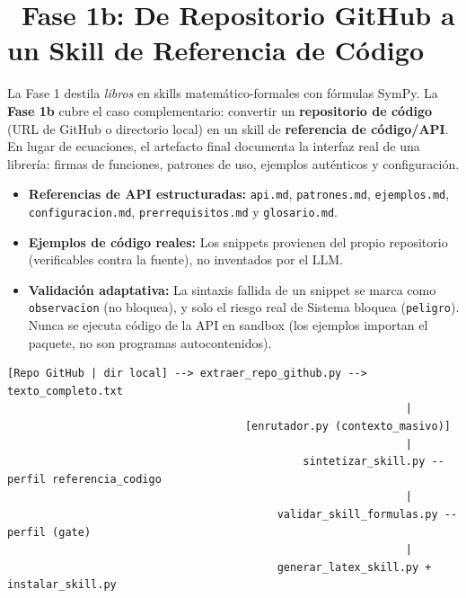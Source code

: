 \documentclass[11pt,a4paper]{article}
\newcommand{\iconotexto}[2]{\textcolor{cyanNeon}{\faIcon{#1}}~#2}
\begin{document}
\newpage
\section[Fase 1b: Repositorio a Skill de API]{\iconotexto{code-branch}{Fase 1b: De Repositorio GitHub a un Skill de Referencia de Código}}

La Fase 1 destila \emph{libros} en skills matemático-formales con fórmulas SymPy. La \textbf{Fase 1b} cubre el caso complementario: convertir un \textbf{repositorio de código} (URL de GitHub o directorio local) en un skill de \textbf{referencia de código/API}. En lugar de ecuaciones, el artefacto final documenta la interfaz real de una librería: firmas de funciones, patrones de uso, ejemplos auténticos y configuración.

\begin{itemize}[leftmargin=*]
  \item \textbf{Referencias de API estructuradas:} \texttt{api.md}, \texttt{patrones.md}, \texttt{ejemplos.md}, \texttt{configuracion.md}, \texttt{prerrequisitos.md} y \texttt{glosario.md}.
  \item \textbf{Ejemplos de código reales:} Los snippets provienen del propio repositorio (verificables contra la fuente), no inventados por el LLM.
  \item \textbf{Validación adaptativa:} La sintaxis fallida de un snippet se marca como \texttt{observacion} (no bloquea), y solo el riesgo real de Sistema bloquea (\texttt{peligro}). Nunca se ejecuta código de la API en sandbox (los ejemplos importan el paquete, no son programas autocontenidos).
\end{itemize}

\begin{tcolorbox}[cajaContenido, title={\faIcon{project-diagram}~Pipeline E2E de la Fase 1b}]
\begin{lstlisting}
[Repo GitHub | dir local] --> extraer_repo_github.py --> texto_completo.txt
                                                              |
                                     [enrutador.py (contexto_masivo)]
                                                              |
                                              sintetizar_skill.py --perfil referencia_codigo
                                                              |
                                          validar_skill_formulas.py --perfil (gate)
                                                              |
                                          generar_latex_skill.py + instalar_skill.py
\end{lstlisting}
\end{tcolorbox}
\end{document}

